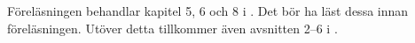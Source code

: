 Föreläsningen behandlar kapitel 5, 6 och 8 i \cite{Brookshear2012csa}.
Det bör ha läst dessa innan föreläsningen.
Utöver detta tillkommer även avsnitten 2--6 i \cite{pythonkramaren1}.
